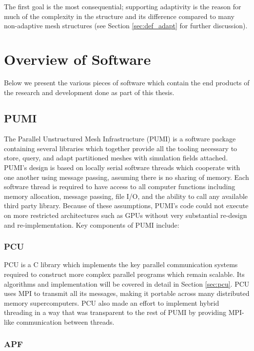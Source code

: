 The first goal is the most consequential; supporting adaptivity
is the reason for much of the complexity in the structure
and its difference compared to many non-adaptive mesh structures
(see Section \ref{sec:def_adapt} for further discussion).

\section{Overview of Software}

Below we present the various pieces of software which contain
the end products of the research and development done as
part of this thesis.

\subsection{PUMI}

The Parallel Unstructured Mesh Infrastructure (PUMI) is a software package
containing several libraries which together provide all the tooling
necessary to store, query, and adapt partitioned meshes with
simulation fields attached.
PUMI's design is based on locally serial software threads which
cooperate with one another using message passing, assuming
there is no sharing of memory.
Each software thread is required to have access to all computer
functions including memory allocation, message passing, file I/O, and the ability
to call any available third party library.
Because of these assumptions, PUMI's code could not execute
on more restricted architectures such as GPUs without very
substantial re-design and re-implementation.
Key components of PUMI include:

\subsubsection{PCU}

PCU is a C library which implements the key parallel communication
systems required to construct more complex parallel programs
which remain scalable.
Its algorithms and implementation will be covered in detail
in Section \ref{sec:pcu}.
PCU uses MPI to transmit all its messages, making it portable
across many distributed memory supercomputers.
PCU also made an effort to implement hybrid threading in
a way that was transparent to the rest of PUMI by providing
MPI-like communication between threads.

\subsubsection{APF}

